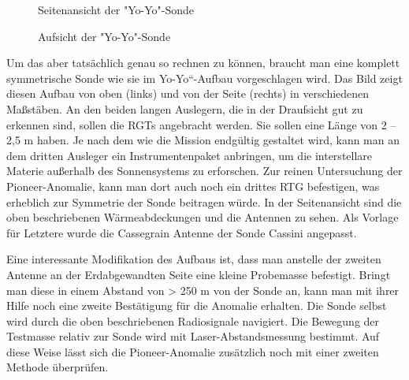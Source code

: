 \begin{figure}[htbn]
\begin{center}
\noindent    
{}
\end{center}
\vskip -10pt
  \caption{Seitenansicht der "Yo-Yo"-Sonde\cite{Nieto2004}}
\label{fig:yoyoside}
\end{figure} 

\begin{figure}[htbn]
\begin{center}
\noindent    
{}
\end{center}
\vskip -10pt
  \caption{Aufsicht der "Yo-Yo"-Sonde\cite{Nieto2004}}
\label{fig:yoyotop}
\end{figure} 


Um das aber tats\"achlich genau so rechnen zu k\"onnen, braucht man
eine komplett symmetrische Sonde wie sie im
{\quotedblbase}Yo-Yo``-Aufbau vorgeschlagen wird. Das Bild zeigt diesen
Aufbau von oben (links) und von der Seite (rechts) in verschiedenen
Ma{\ss}st\"aben. An den beiden langen Auslegern, die in der Draufsicht
gut zu erkennen sind, sollen die RGTs ange\-bracht werden. Sie sollen
eine L\"ange von 2 -- 2,5 m haben. Je nach dem wie die Mission
endg\"ultig gestaltet wird, kann man an dem dritten Ausleger ein
Instrumentenpaket an\-bringen, um die interstellare Materie
au{\ss}erhalb des Sonnensystems zu erforschen. Zur rei\-nen
Untersuchung der Pioneer-Anomalie, kann man dort auch noch ein drittes
RTG befestigen, was erheblich zur Symmetrie der Sonde beitragen
w\"urde. In der Seitenansicht sind die oben beschriebenen
W\"armeabdeckungen und die Antennen zu sehen. Als Vorlage f\"ur
Letztere wurde die Cassegrain Antenne der Sonde Cassini angepasst.


\bigskip

Eine interessante Modifikation des Aufbaus ist, dass man anstelle der
zweiten Antenne an der Erdabgewandten Seite eine kleine Probemasse
befestigt. Bringt man diese in einem Abstand von {\textgreater} 250 m
von der Sonde an, kann man mit ihrer Hilfe noch eine zweite
Best\"a\-tigung f\"ur die Anomalie erhalten. Die Sonde selbst wird
durch die oben beschriebenen Ra\-diosignale navigiert. Die Bewegung der
Testmasse relativ zur Sonde wird mit Laser-Ab\-standsmessung bestimmt.
Auf diese Weise l\"asst sich die Pioneer-Anomalie zus\"atzlich noch mit
einer zweiten Methode \"uberpr\"ufen. 


\begin{figure}[htbn]
\begin{center}
\noindent    
{}
\end{center}
\vskip -10pt
  \caption{\cite{alle2005}}
\label{fig:lasersonde}
\end{figure} 

